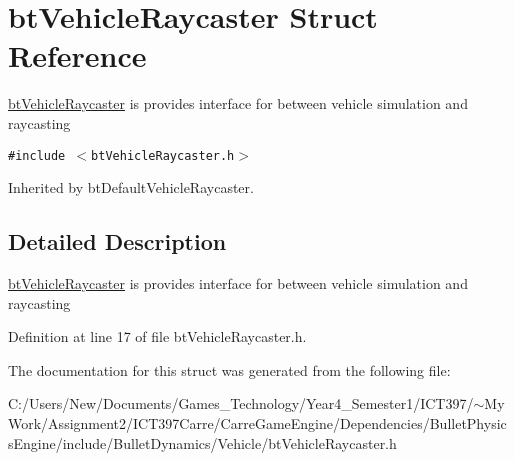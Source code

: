 \hypertarget{structbt_vehicle_raycaster}{
\section{btVehicleRaycaster Struct Reference}
\label{structbt_vehicle_raycaster}
}
\hyperlink{structbt_vehicle_raycaster}{btVehicleRaycaster} is provides interface for between vehicle simulation and raycasting  


{\tt \#include $<$btVehicleRaycaster.h$>$}

Inherited by btDefaultVehicleRaycaster.



\subsection{Detailed Description}
\hyperlink{structbt_vehicle_raycaster}{btVehicleRaycaster} is provides interface for between vehicle simulation and raycasting 

Definition at line 17 of file btVehicleRaycaster.h.

The documentation for this struct was generated from the following file:\begin{CompactItemize}
\item 
C:/Users/New/Documents/Games\_\-Technology/Year4\_\-Semester1/ICT397/$\sim$My Work/Assignment2/ICT397Carre/CarreGameEngine/Dependencies/BulletPhysicsEngine/include/BulletDynamics/Vehicle/btVehicleRaycaster.h\end{CompactItemize}

